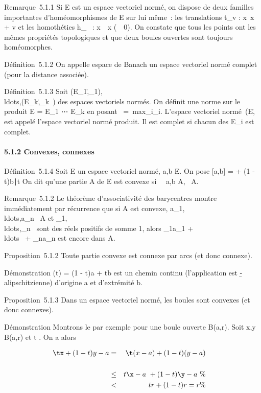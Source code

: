\documentclass[]{article}
\begin{document}
Remarque~5.1.1 Si E est un espace vectoriel normé, on dispose de deux
familles importantes d'homéomorphismes de E sur lui même~: les
translations t_v : x\mapsto~x + v et les
homothéties h_\lambda~ : x\mapsto~\lambda~x
(\lambda~\neq~0). On constate que tous les points ont
les mêmes propriétés topologiques et que deux boules ouvertes sont
toujours homéomorphes.

Définition~5.1.2 On appelle espace de Banach un espace vectoriel normé
complet (pour la distance associée).

Définition~5.1.3 Soit
(E_1,\._1),\\ldots,(E_k,\._k~)
des espaces vectoriels normés. On définit une norme sur le produit E =
E_1 \times⋯ \times E_k en posant
\x\
=\
max\x_i_i.
L'espace vectoriel
normé~(E,\.\) est
appelé l'espace vectoriel normé produit. Il est complet si chacun des
E_i est complet.

\paragraph{5.1.2 Convexes, connexes}

Définition~5.1.4 Soit E un espace vectoriel normé, a,b \in E. On pose
[a,b] = \ta + (1 - t)b∣t
\in [0,1]\. On dit qu'une partie A de E est convexe
si \forall~~a,b \in A,\quad [a,b] \subset~
A.

Remarque~5.1.2 Le théorème d'associativité des barycentres montre
immédiatement par récurrence que si A est convexe,
a_1,\\ldots,a_n~
\in A et
\lambda_1,\\ldots,\lambda_n~
sont des réels positifs de somme 1, alors \lambda_1a_1 +
\\ldots~ +
\lambda_na_n est encore dans A.

Proposition~5.1.2 Toute partie convexe est connexe par arcs (et donc
connexe).

Démonstration \gamma(t) = (1 - t)a + tb est un chemin continu (l'application
est \b -
a\-lipschitzienne) d'origine a et d'extrémité
b.

Proposition~5.1.3 Dans un espace vectoriel normé, les boules sont
convexes (et donc connexes).

Démonstration Montrons le par exemple pour une boule ouverte B(a,r).
Soit x,y \in B(a,r) et t \in [0,1]. On a alors

\begin{align*} \tx + (1 -
t)y - a& =& \t(x -
a) + (1 - t)(y - a)\\%
\\ & \leq& t\x -
a\ + (1 - t)\y -
a\ \%& \\ &
<& tr + (1 - t)r = r \%& \\
\end{align*}
\end{document}
